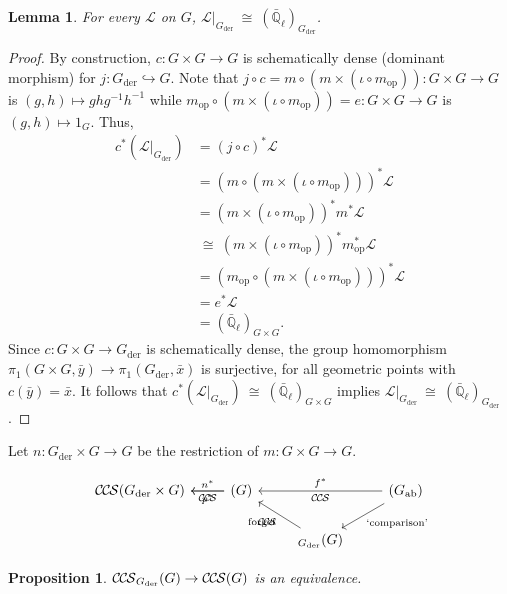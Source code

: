 \documentclass[10pt]{amsart}
\theoremstyle{plain}
\newtheorem{proposition}[theorem]{Proposition}
\newtheorem{lemma}[theorem]{Lemma}
\theoremstyle{definition}
\newcommand{\EE}{\mathbb{\bar Q}_\ell}
\newcommand{\op}{_{\operatorname{op}}}
\newcommand{\der}{_{\operatorname{der}}}
\newcommand{\ab}{_{\operatorname{ab}}}
\newcommand{\iso}{{\ \cong\ }}
\newcommand{\cs}[1]{{\mathcal{#1}}}
\newcommand{\CCS}{{\mathcal{C\hskip-.8pt C\hskip-0.8pt S}}}
\begin{document}
\begin{lemma}\label{lem:Lder}
For every $\cs{L}$ on $G$, $\cs{L}\vert_{G\der} \iso (\EE)_{G\der}$.
\end{lemma}

\begin{proof}
By construction, $c : G \times G \to G$ is schematically dense (dominant morphism) for $j : G\der \hookrightarrow G$. 
Note that $j\circ c = m\circ (m \times (\iota\circ m\op)) : G \times G \to G$ is $(g,h) \mapsto gh g^{-1}h^{-1}$ while $m\op\circ (m \times (\iota\circ m\op))= e : G \times G \to G$ is $(g,h) \mapsto 1_G$. Thus,
\begin{align*}
c^* (\cs{L}\vert_{G\der})
&=  (j\circ c)^*\cs{L} \\
&= (m\circ (m \times (\iota\circ m\op)))^* \cs{L} \\
&= (m \times (\iota\circ m\op))^* m^* \cs{L} \\
&\iso (m \times (\iota\circ m\op))^* m\op^* \cs{L} \\
&= (m\op\circ (m \times (\iota\circ m\op)))^* \cs{L} \\
&= e^* \cs{L}\\
&= (\EE)_{G\times G}.
\end{align*}
Since $c : G \times G \to G\der$ is schematically dense, the group homomorphism $\pi_1(G\times G, {\bar y}) \to \pi_1(G\der, {\bar x})$ is surjective, for all geometric points with $c({\bar y}) = {\bar x}$. It follows that $c^* (\cs{L}\vert_{G\der}) \iso (\EE)_{G\times G}$ implies $\cs{L}\vert_{G\der} \iso (\EE)_{G\der}$. 
\end{proof}

Let $n : G\der \times G \to G$ be the restriction of $m: G\times G \to G$.

\[
\begin{tikzcd}
\CCS(G\der \times G)
& \arrow{l}[shift left,swap]{n^*}
  \arrow{l}[shift right]{p^*}
\CCS(G) 
&&\arrow{ll}[swap]{f^*} 
\CCS(G\ab) \arrow{dl}{\text{`comparison'}}\\
& & \arrow{ul}{\text{forget}} \CCS_{G\der}(G) & 
\end{tikzcd}
\]


\begin{proposition}\label{prop:Gder-equivariance}
$\CCS_{G\der}(G) \to \CCS(G)$ is an equivalence.
\end{proposition}
\end{document}

